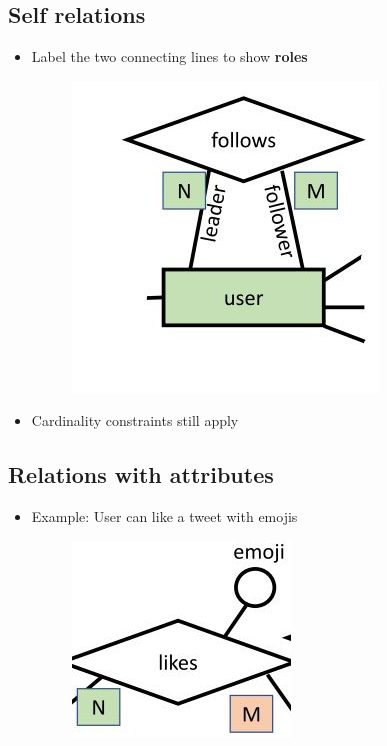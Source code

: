 \documentclass[conference]{IEEEtran}
\begin{document}
\subsection{Self relations}

\begin{itemize}
    \item Label the two connecting lines to show \textbf{roles}
    \begin{figure} [h!]
        \centering
        \includegraphics[scale=0.5]{Ex10.JPG}
    \end{figure}

    \item Cardinality constraints still apply
\end{itemize}

\subsection{Relations with attributes}

\begin{itemize}
    \item Example: User can like a tweet with emojis
    \begin{figure} [h!]
        \centering
        \includegraphics[scale=0.5]{Ex12.JPG}
    \end{figure}
\end{itemize}
\end{document}
